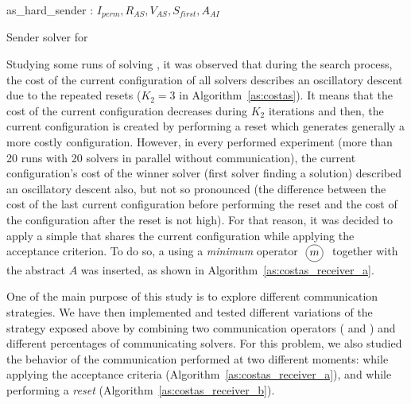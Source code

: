 \begin{algorithm}[h]
\dontprintsemicolon
\SetNoline
{}
   as\_hard\_sender\;
\algoindent {} : $I_{perm}, R_{AS}, V_{AS}, S_{first}, A_{AI}$ \;
\caption{Sender solver for \CARRP}\label{as:costas_sender}
\end{algorithm}

Studying some runs of \posl{} solving \CARRP{}, it was observed that during the search process, the cost of the current configuration of all solvers describes an oscillatory descent due to the repeated resets ($K_2 = 3$ in Algorithm~\ref{as:costas}). It means that the cost of the current configuration decreases during $K_2$ iterations and then, the current configuration is created by performing a reset which generates generally a more costly configuration. However, in every performed experiment (more than 20 runs with 20 solvers in parallel without communication), the current configuration's cost of the winner solver (first solver finding a solution) described an oscillatory descent also, but not so pronounced (\ie the difference between the cost of the last current configuration before performing the reset and the cost of the configuration after the reset is not high). For that reason, it was decided to apply a simple \commstr{} that shares the current configuration while applying the acceptance criterion. To do so, a \opch{} using a \textit{minimum} operator $\poslop{m}$ together with the abstract \om{} $A$ was inserted, as shown in Algorithm~\ref{as:costas_receiver_a}.

One of the main purpose of this study is to explore different communication strategies. We have then implemented and tested different variations of the strategy exposed above by combining two communication operators (\oneTone{} and \oneTn) and different percentages of communicating solvers.
For this problem, we also studied the behavior of the communication performed at two different moments: while applying the acceptance criteria (Algorithm~\ref{as:costas_receiver_a}), and while performing a {\it reset} (Algorithm~\ref{as:costas_receiver_b}).

